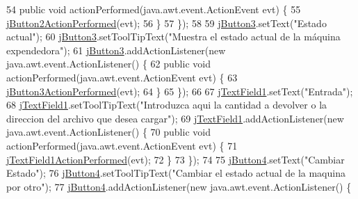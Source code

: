 \begin{DoxyCode}
54             \textcolor{keyword}{public} \textcolor{keywordtype}{void} actionPerformed(java.awt.event.ActionEvent evt) \{
55                 \mbox{\hyperlink{class_interfaz_1_1_ventana_inicial_a979092d824f639fd81891bcdf5351cbb}{jButton2ActionPerformed}}(evt);
56             \}
57         \});
58 
59         \mbox{\hyperlink{class_interfaz_1_1_ventana_inicial_af37a09af6b2d616c14a3d77d835eb34d}{jButton3}}.setText(\textcolor{stringliteral}{"Estado actual"});
60         \mbox{\hyperlink{class_interfaz_1_1_ventana_inicial_af37a09af6b2d616c14a3d77d835eb34d}{jButton3}}.setToolTipText(\textcolor{stringliteral}{"Muestra el estado actual de la máquina expendedora"});
61         \mbox{\hyperlink{class_interfaz_1_1_ventana_inicial_af37a09af6b2d616c14a3d77d835eb34d}{jButton3}}.addActionListener(\textcolor{keyword}{new} java.awt.event.ActionListener() \{
62             \textcolor{keyword}{public} \textcolor{keywordtype}{void} actionPerformed(java.awt.event.ActionEvent evt) \{
63                 \mbox{\hyperlink{class_interfaz_1_1_ventana_inicial_a8b32a9edce9bedd6164369c723fc6528}{jButton3ActionPerformed}}(evt);
64             \}
65         \});
66 
67         \mbox{\hyperlink{class_interfaz_1_1_ventana_inicial_a45365129af4acf435140853b35aec365}{jTextField1}}.setText(\textcolor{stringliteral}{"Entrada"});
68         \mbox{\hyperlink{class_interfaz_1_1_ventana_inicial_a45365129af4acf435140853b35aec365}{jTextField1}}.setToolTipText(\textcolor{stringliteral}{"Introduzca aqui la cantidad a devolver o la direccion del
       archivo que desea cargar"});
69         \mbox{\hyperlink{class_interfaz_1_1_ventana_inicial_a45365129af4acf435140853b35aec365}{jTextField1}}.addActionListener(\textcolor{keyword}{new} java.awt.event.ActionListener() \{
70             \textcolor{keyword}{public} \textcolor{keywordtype}{void} actionPerformed(java.awt.event.ActionEvent evt) \{
71                 \mbox{\hyperlink{class_interfaz_1_1_ventana_inicial_a9c3c5c3a37751a96caad2531a6c8faf5}{jTextField1ActionPerformed}}(evt);
72             \}
73         \});
74 
75         \mbox{\hyperlink{class_interfaz_1_1_ventana_inicial_ad0c38a518bd73dd033484143f67a8c2b}{jButton4}}.setText(\textcolor{stringliteral}{"Cambiar Estado"});
76         \mbox{\hyperlink{class_interfaz_1_1_ventana_inicial_ad0c38a518bd73dd033484143f67a8c2b}{jButton4}}.setToolTipText(\textcolor{stringliteral}{"Cambiar el estado actual de la maquina por otro"});
77         \mbox{\hyperlink{class_interfaz_1_1_ventana_inicial_ad0c38a518bd73dd033484143f67a8c2b}{jButton4}}.addActionListener(\textcolor{keyword}{new} java.awt.event.ActionListener() \{

\end{DoxyCode}
